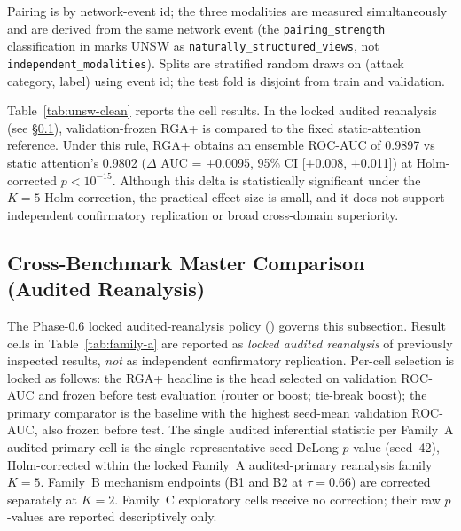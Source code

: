 \documentclass[10pt,conference]{IEEEtran}
\newcommand{\methodplus}{RGA+}
\begin{document}
Pairing is by network-event id; the three modalities are measured
simultaneously and are derived from the same network event (the
\texttt{pairing\_strength} classification in
 marks UNSW as
\texttt{naturally\_structured\_views}, not
\texttt{independent\_modalities}). Splits are stratified random draws
on (attack category, label) using event id; the test fold is disjoint
from train and validation.


Table~\ref{tab:unsw-clean} reports the cell results. In the locked audited reanalysis (see §\ref{sec:cross-benchmark-master}), validation-frozen RGA+ is compared to the fixed static-attention reference. Under this rule, RGA+ obtains an ensemble ROC-AUC of 0.9897 vs static attention's 0.9802 ($\Delta$ AUC = +0.0095, 95\% CI [+0.008, +0.011]) at Holm-corrected $p < 10^{-15}$. Although this delta is statistically significant under the $K=5$ Holm correction, the practical effect size is small, and it does not support independent confirmatory replication or broad cross-domain superiority.

\subsection{Cross-Benchmark Master Comparison (Audited Reanalysis)}
\label{sec:cross-benchmark-master}

The Phase-0.6 locked audited-reanalysis policy
() governs
this subsection. Result cells in
Table~\ref{tab:family-a} are reported as \emph{locked audited
reanalysis} of previously inspected results, \emph{not} as independent
confirmatory replication. Per-cell selection is locked as follows:
the \methodplus{} headline is the head selected on validation ROC-AUC
and frozen before test evaluation (router or boost; tie-break boost);
the primary comparator is the baseline with the highest seed-mean
validation ROC-AUC, also frozen before test. The single audited
inferential statistic per Family~A audited-primary cell is the
single-representative-seed DeLong $p$-value (seed~42), Holm-corrected
within the locked Family~A audited-primary reanalysis family $K{=}5$. Family~B
mechanism endpoints (B1 and B2 at $\tau{=}0.66$) are corrected
separately at $K{=}2$. Family~C exploratory cells receive no
correction; their raw $p$-values are reported descriptively only.
\end{document}

